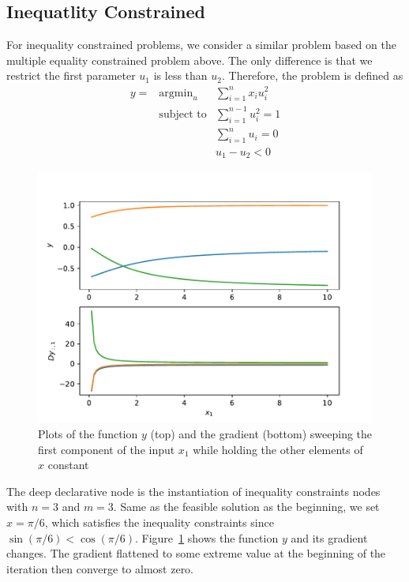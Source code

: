 \subsection{Inequatlity Constrained}
For inequality constrained problems, we consider a similar problem based on the multiple equality constrained problem above. The only difference is that we restrict the first parameter $u_1$ is less than $u_2$. Therefore, the problem is defined as
\begin{equation}
    \begin{array}{rll}
        y =& \text{argmin}_u & \sum_{i=1}^{n} x_i u_i^{2} \\
        & \text{subject to} & \sum_{i=1}^{n-1} u_i^2 = 1 \\
        & & \sum_{i=1}^{n} u_i = 0 \\
        & & u_1 - u_2 < 0
    \end{array}
\end{equation}
\begin{figure}[t]
    \label{fig:ineq-eg}
    \centering
    \includegraphics[page=1,width=.8\textwidth]{figs/multiple_inequality_example.pdf} 
    \caption{Plots of the function $y$ (top) and the gradient (bottom) sweeping the first component of the input $x_1$ while holding the other elements of $x$ constant}
\end{figure}
\par The deep declarative node is the instantiation of inequality constraints nodes with $n=3$ and $m=3$. Same as the feasible solution as the beginning, we set $x=\pi / 6$, which satisfies the inequality constraints since $\sin (\pi/6) < \cos (\pi/6)$. Figure~\ref{fig:ineq-eg} shows the function $y$ and its gradient changes. The gradient flattened to some extreme value at the beginning of the iteration then converge to almost zero. 

